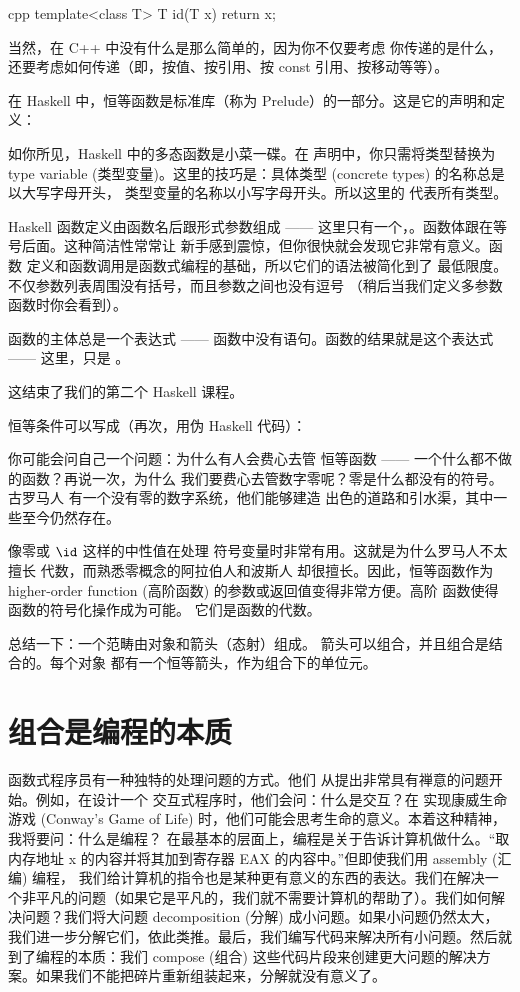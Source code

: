 \begin{snip}{cpp}
template<class T> T id(T x) { return x; }
\end{snip}
当然，在 C++ 中没有什么是那么简单的，因为你不仅要考虑
你传递的是什么，还要考虑如何传递（即，按值、按引用、按 const 引用、按移动等等）。

在 Haskell 中，恒等函数是标准库（称为 Prelude）的一部分。这是它的声明和定义：

如你所见，Haskell 中的多态函数是小菜一碟。在
声明中，你只需将类型替换为 type variable (类型变量)。这里的技巧是：具体类型 (concrete types) 的名称总是以大写字母开头，
类型变量的名称以小写字母开头。所以这里的
 代表所有类型。

Haskell 函数定义由函数名后跟形式参数组成 —— 这里只有一个，。函数体跟在等号后面。这种简洁性常常让
新手感到震惊，但你很快就会发现它非常有意义。函数
定义和函数调用是函数式编程的基础，所以它们的语法被简化到了
最低限度。不仅参数列表周围没有括号，而且参数之间也没有逗号
（稍后当我们定义多参数函数时你会看到）。

函数的主体总是一个表达式 —— 函数中没有语句。函数的结果就是这个表达式 ——
这里，只是 。

这结束了我们的第二个 Haskell 课程。

恒等条件可以写成（再次，用伪 Haskell 代码）：

你可能会问自己一个问题：为什么有人会费心去管
恒等函数 —— 一个什么都不做的函数？再说一次，为什么
我们要费心去管数字零呢？零是什么都没有的符号。古罗马人
有一个没有零的数字系统，他们能够建造
出色的道路和引水渠，其中一些至今仍然存在。

像零或 $\id$ 这样的中性值在处理
符号变量时非常有用。这就是为什么罗马人不太擅长
代数，而熟悉零概念的阿拉伯人和波斯人
却很擅长。因此，恒等函数作为 higher-order function (高阶函数) 的参数或返回值变得非常方便。高阶
函数使得函数的符号化操作成为可能。
它们是函数的代数。

总结一下：一个范畴由对象和箭头（态射）组成。
箭头可以组合，并且组合是结合的。每个对象
都有一个恒等箭头，作为组合下的单位元。

\section{组合是编程的本质}

函数式程序员有一种独特的处理问题的方式。他们
从提出非常具有禅意的问题开始。例如，在设计一个
交互式程序时，他们会问：什么是交互？在
实现康威生命游戏 (Conway's Game of Life) 时，他们可能会思考生命的意义。本着这种精神，我将要问：什么是编程？
在最基本的层面上，编程是关于告诉计算机做什么。“取内存地址 x 的内容并将其加到寄存器 EAX 的内容中。”但即使我们用 assembly (汇编) 编程，
我们给计算机的指令也是某种更有意义的东西的表达。我们在解决一个非平凡的问题（如果它是平凡的，我们就不需要计算机的帮助了）。我们如何解决问题？我们将大问题 decomposition (分解) 成小问题。如果小问题仍然太大，我们进一步分解它们，依此类推。最后，我们编写代码来解决所有小问题。然后就到了编程的本质：我们 compose (组合) 这些代码片段来创建更大问题的解决方案。如果我们不能把碎片重新组装起来，分解就没有意义了。

